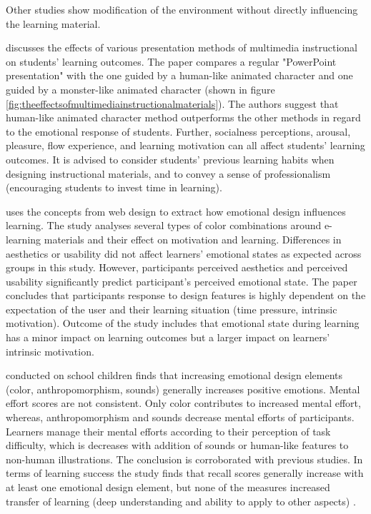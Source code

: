 

		
		Other studies show modification of the environment without directly influencing the learning material.
		
		\cite{Lee2014} discusses the effects of various presentation methods of multimedia instructional on students’ learning outcomes. The paper compares a regular "PowerPoint presentation" with the one guided by a human-like animated character and one guided by a monster-like animated character (shown in figure \ref{fig:theeffectsofmultimediainstructionalmaterials}). The authors suggest that human-like animated character method outperforms the other methods in regard to the emotional response of students. Further, socialness perceptions, arousal, pleasure, flow experience, and learning motivation can all affect students’ learning outcomes. It is advised to consider students’ previous learning habits when designing instructional materials, and to convey a sense of professionalism (encouraging students to invest time in learning).
	
		\cite{Heidig2015} uses the concepts from web design to extract how emotional design influences learning. The study analyses several types of color combinations around e-learning materials and their effect on motivation and learning. Differences in aesthetics or usability did not affect learners’ emotional states as expected across groups in this study. However, participants perceived aesthetics and perceived usability significantly predict participant's perceived emotional state. The paper concludes that participants response to design features is highly dependent on the expectation of the user and their learning situation (time pressure, intrinsic motivation). Outcome of the study includes that emotional state during learning has a minor impact on learning outcomes but a larger impact on learners’ intrinsic motivation.
		
		\cite{Uzun2018} conducted on school children finds that increasing emotional design elements (color, anthropomorphism, sounds) generally increases positive emotions. Mental effort scores are not consistent. Only color contributes to increased mental effort, whereas, anthropomorphism and sounds decrease mental efforts of participants. Learners manage their mental efforts according to their perception of task difficulty, which is decreases with addition of sounds or human-like features to non-human illustrations. The conclusion is corroborated with previous studies. In terms of learning success the study finds that recall scores generally increase with at least one emotional design element, but none of the measures increased transfer of learning (deep understanding and ability to apply to other aspects) \cite{Uzun2018}.
		
